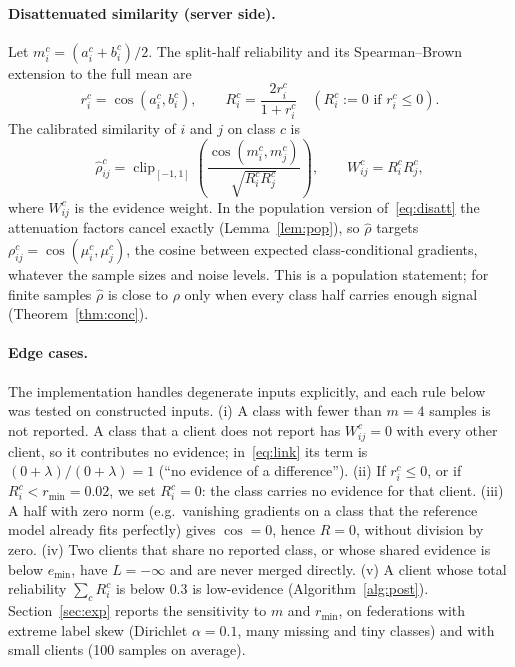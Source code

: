 \documentclass[11pt]{article}
\theoremstyle{definition}
\theoremstyle{remark}
\newcommand{\rhohat}{\hat\rho}
\begin{document}
\paragraph{Disattenuated similarity (server side).}
Let $m_i^c=(a_i^c+b_i^c)/2$. The split-half reliability and its Spearman--Brown extension to the full mean are
\begin{equation}\label{eq:rel}
r_i^c=\cos(a_i^c,b_i^c),\qquad R_i^c=\frac{2r_i^c}{1+r_i^c}\quad(R_i^c:=0 \text{ if } r_i^c\le 0).
\end{equation}
The calibrated similarity of $i$ and $j$ on class $c$ is
\begin{equation}\label{eq:disatt}
\rhohat_{ij}^c=\operatorname{clip}_{[-1,1]}\!\left(\frac{\cos(m_i^c,m_j^c)}{\sqrt{R_i^cR_j^c}}\right),\qquad W_{ij}^c=R_i^cR_j^c,
\end{equation}
where $W_{ij}^c$ is the evidence weight. In the population version of~\eqref{eq:disatt} the attenuation factors cancel exactly (Lemma~\ref{lem:pop}), so $\rhohat$ targets $\rho_{ij}^c=\cos(\mu_i^c,\mu_j^c)$, the cosine between expected class-conditional gradients, whatever the sample sizes and noise levels. This is a population statement; for finite samples $\rhohat$ is close to $\rho$ only when every class half carries enough signal (Theorem~\ref{thm:conc}).

\paragraph{Edge cases.} The implementation handles degenerate inputs explicitly, and each rule below was tested on constructed inputs. (i) A class with fewer than $m=4$ samples is not reported. A class that a client does not report has $W^c_{ij}=0$ with every other client, so it contributes no evidence; in~\eqref{eq:link} its term is $(0+\lambda)/(0+\lambda)=1$ (``no evidence of a difference''). (ii) If $r_i^c\le0$, or if $R_i^c<r_{\min}=0.02$, we set $R_i^c=0$: the class carries no evidence for that client. (iii) A half with zero norm (e.g.\ vanishing gradients on a class that the reference model already fits perfectly) gives $\cos=0$, hence $R=0$, without division by zero. (iv) Two clients that share no reported class, or whose shared evidence is below $e_{\min}$, have $L=-\infty$ and are never merged directly. (v) A client whose total reliability $\sum_cR_i^c$ is below $0.3$ is low-evidence (Algorithm~\ref{alg:post}). Section~\ref{sec:exp} reports the sensitivity to $m$ and $r_{\min}$, on federations with extreme label skew (Dirichlet $\alpha=0.1$, many missing and tiny classes) and with small clients (100 samples on average).
\end{document}
